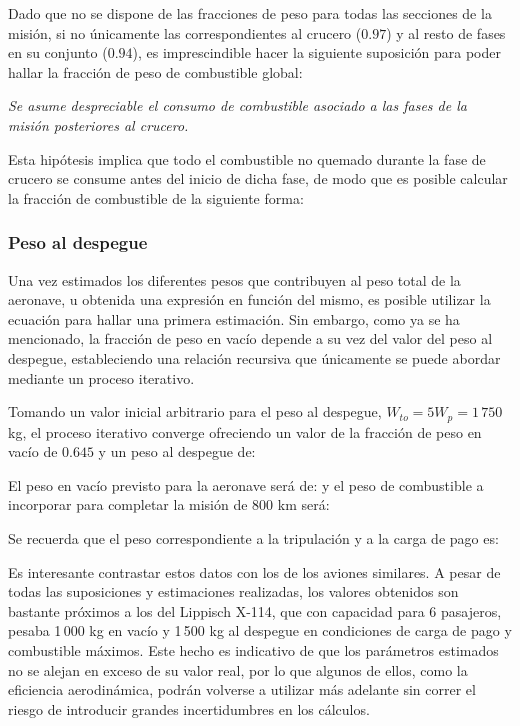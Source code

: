 Dado que no se dispone de las fracciones de peso para todas las secciones de la misión, si no únicamente las correspondientes al crucero ($0.97$) y al resto de fases en su conjunto ($0.94$), es imprescindible hacer la siguiente suposición para poder hallar la fracción de peso de combustible global:

\emph{Se asume despreciable el consumo de combustible asociado a las fases de la misión posteriores al crucero.}

Esta hipótesis implica que todo el combustible no quemado durante la fase de crucero se consume antes del inicio de dicha fase, de modo que es posible calcular la fracción de combustible de la siguiente forma:


\subsubsection{Peso al despegue}
\label{sec:design:weights:to}

Una vez estimados los diferentes pesos que contribuyen al peso total de la aeronave, u obtenida una expresión en función del mismo, es posible utilizar la ecuación  para hallar una primera estimación. Sin embargo, como ya se ha mencionado, la fracción de peso en vacío depende a su vez del valor del peso al despegue, estableciendo una relación recursiva que únicamente se puede abordar mediante un proceso iterativo.

Tomando un valor inicial arbitrario para el peso al despegue, $W_{to} = 5W_p = 1\,750$ kg, el proceso iterativo converge ofreciendo un valor de la fracción de peso en vacío de $0.645$ y un peso al despegue de:

El peso en vacío previsto para la aeronave será de:
y el peso de combustible a incorporar para completar la misión de 800 km será:

Se recuerda que el peso correspondiente a la tripulación y a la carga de pago es:

Es interesante contrastar estos datos con los de los aviones similares. A pesar de todas las suposiciones y estimaciones realizadas, los valores obtenidos son bastante próximos a los del Lippisch X-114, que con capacidad para 6 pasajeros, pesaba 1\,000 kg en vacío y 1\,500 kg al despegue en condiciones de carga de pago y combustible máximos. Este hecho es indicativo de que los parámetros estimados no se alejan en exceso de su valor real, por lo que algunos de ellos, como la eficiencia aerodinámica, podrán volverse a utilizar más adelante sin correr el riesgo de introducir grandes incertidumbres en los cálculos.


